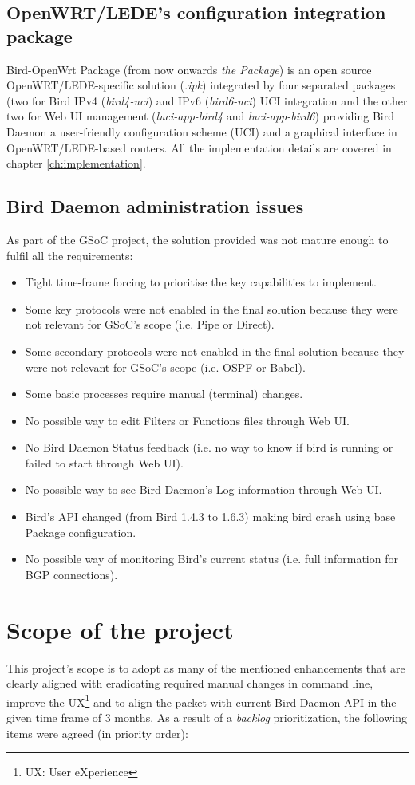 \subsection{OpenWRT/LEDE's configuration integration package}
Bird-OpenWrt Package (from now onwards \textit{the Package}) is an open source OpenWRT/LEDE-specific solution (\textit{.ipk}) integrated by four separated packages (two for Bird IPv4 (\textit{bird4-uci}) and IPv6 (\textit{bird6-uci}) UCI integration and the other two for Web UI management (\textit{luci-app-bird4} and \textit{luci-app-bird6}) providing Bird Daemon a user-friendly configuration scheme (UCI) and a graphical interface in OpenWRT/LEDE-based routers. All the implementation details are covered in chapter \ref{ch:implementation}.

\subsection{Bird Daemon administration issues}
\label{subsec:bdai}
As part of the GSoC project, the solution provided was not mature enough to fulfil all the requirements:
\begin{itemize}
    \item Tight time-frame forcing to prioritise the key capabilities to implement.
    \item Some key protocols were not enabled in the final solution because they were not relevant for GSoC's scope (i.e. Pipe or Direct).
    \item Some secondary protocols were not enabled in the final solution because they were not relevant for GSoC's scope (i.e. OSPF or Babel).
    \item Some basic processes require manual (terminal) changes.
    \item No possible way to edit Filters or Functions files through Web UI.
    \item No Bird Daemon Status feedback (i.e. no way to know if bird is running or failed to start through Web UI).
    \item No possible way to see Bird Daemon's Log information through Web UI.
    \item Bird's API changed (from Bird 1.4.3 to 1.6.3) making bird crash using base Package configuration.
    \item No possible way of monitoring Bird's current status (i.e. full information for BGP connections).
\end{itemize}
\section{Scope of the project}
\label{sec:sotp}
This project's scope is to adopt as many of the mentioned enhancements that are clearly aligned with eradicating required manual changes in command line, improve the UX\footnote{UX: User eXperience} and to align the packet with current Bird Daemon API in the given time frame of 3 months. As a result of a \textit{backlog} prioritization, the following items were agreed (in priority order):

